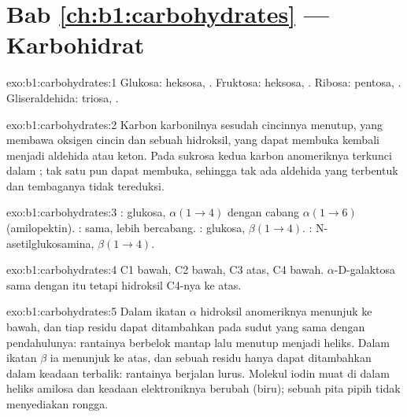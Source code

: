 \section*{Bab \ref{ch:b1:carbohydrates} --- Karbohidrat}

\begin{solution}{exo:b1:carbohydrates:1}
Glukosa: heksosa, . Fruktosa: heksosa, . Ribosa: pentosa,
. Gliseraldehida: triosa, .
\end{solution}

\begin{solution}{exo:b1:carbohydrates:2}
Karbon karbonilnya sesudah cincinnya menutup, yang membawa oksigen
cincin dan sebuah hidroksil, yang dapat membuka kembali menjadi
aldehida atau keton. Pada sukrosa kedua karbon anomeriknya terkunci
dalam ; tak satu pun dapat membuka, sehingga tak ada
aldehida yang terbentuk dan tembaganya tidak tereduksi.
\end{solution}

\begin{solution}{exo:b1:carbohydrates:3}
: glukosa, $\alpha(1{\to}4)$ dengan cabang $\alpha(1{\to}6)$
(amilopektin). : sama, lebih bercabang. : glukosa,
$\beta(1{\to}4)$. : N-asetilglukosamina, $\beta(1{\to}4)$.
\end{solution}

\begin{solution}{exo:b1:carbohydrates:4}
C1 bawah, C2 bawah, C3 atas, C4 bawah. $\alpha$-D-galaktosa sama dengan
itu tetapi hidroksil C4-nya ke atas.
\end{solution}

\begin{solution}{exo:b1:carbohydrates:5}
Dalam ikatan $\alpha$ hidroksil anomeriknya menunjuk ke bawah, dan tiap
residu dapat ditambahkan pada sudut yang sama dengan pendahulunya:
rantainya berbelok mantap lalu menutup menjadi heliks. Dalam ikatan
$\beta$ ia menunjuk ke atas, dan sebuah residu hanya dapat ditambahkan
dalam keadaan terbalik: rantainya berjalan lurus. Molekul iodin muat di
dalam heliks amilosa dan keadaan elektroniknya berubah (biru); sebuah
pita pipih tidak menyediakan rongga.
\end{solution}

